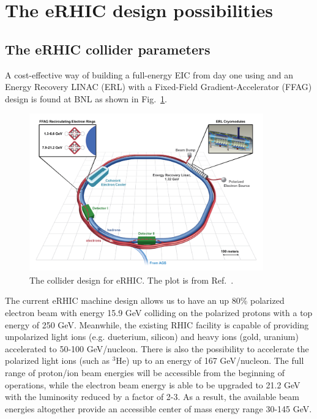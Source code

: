 \section{The eRHIC design possibilities}

\subsection{The eRHIC collider parameters}
A cost-effective way of building a full-energy EIC from day one using and an
Energy Recovery LINAC (ERL) with a Fixed-Field Gradient-Accelerator (FFAG)
design is found at BNL as shown in Fig.~\ref{fig:collider_eRHIC}.
\begin{figure}
\centering
\includegraphics[width=0.9\textwidth]{plots/chpt4/collider_eRHIC.png}
\caption[A layout of the eRHIC collider design]{
The collider design for eRHIC. The plot is from Ref.~\cite{Aschenauer:2014a}.}
\label{fig:collider_eRHIC}
\end{figure}
The current eRHIC machine design allows us to have an up 80\% polarized electron
beam with energy 15.9 GeV colliding on the polarized protons with a top energy
of 250 GeV. Meanwhile, the existing RHIC facility is capable of providing
unpolarized light ions (e.g. dueterium, silicon) and heavy ions (gold, uranium)
accelerated to 50-100 GeV/nucleon. There is also the possibility to accelerate
the polarized light ions (such as $^{3}$He) up to an energy of 167 GeV/nucleon.
The full range of proton/ion beam energies will be accessible from the beginning
of operations, while the electron beam energy is able to be upgraded to 21.2 GeV
with the luminosity reduced by a factor of 2-3. As a result, the available beam
energies altogether provide an accessible center of mass energy range 30-145
GeV.



